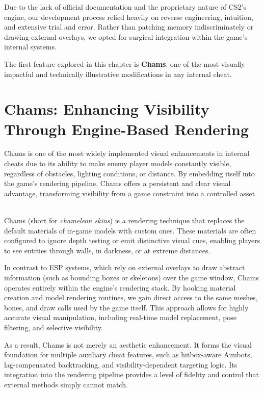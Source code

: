 Due to the lack of official documentation and the proprietary nature of CS2’s engine, our development process relied heavily on reverse engineering, intuition, and extensive trial and error. Rather than patching memory indiscriminately or drawing external overlays, we opted for surgical integration within the game’s internal systems.

The first feature explored in this chapter is \textbf{Chams}, one of the most visually impactful and technically illustrative modifications in any internal cheat.

\section{Chams: Enhancing Visibility Through Engine-Based Rendering}

Chams is one of the most widely implemented visual enhancements in internal cheats due to its ability to make enemy player models constantly visible, regardless of obstacles, lighting conditions, or distance. By embedding itself into the game’s rendering pipeline, Chams offers a persistent and clear visual advantage, transforming visibility from a game constraint into a controlled asset.

\begin{tcolorbox}[colback=gray!10, colframe=gray!50, boxrule=0pt, sharp corners, width=\linewidth, left=1mm, right=1mm, top=0.5mm, bottom=0.5mm]
 \\
    Chams (short for \textit{chameleon skins}) is a rendering technique that replaces the default materials of in-game models with custom ones. These materials are often configured to ignore depth testing or emit distinctive visual cues, enabling players to see entities through walls, in darkness, or at extreme distances.
\end{tcolorbox}

In contrast to ESP systems, which rely on external overlays to draw abstract information (such as bounding boxes or skeletons) over the game window, Chams operates entirely within the engine's rendering stack. By hooking material creation and model rendering routines, we gain direct access to the same meshes, bones, and draw calls used by the game itself. This approach allows for highly accurate visual manipulation, including real-time model replacement, pose filtering, and selective visibility.

As a result, Chams is not merely an aesthetic enhancement. It forms the visual foundation for multiple auxiliary cheat features, such as hitbox-aware Aimbots, lag-compensated backtracking, and visibility-dependent targeting logic. Its integration into the rendering pipeline provides a level of fidelity and control that external methods simply cannot match.

